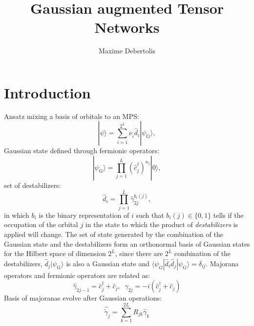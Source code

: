 \documentclass[a4paper, twocolumn, superscriptaddress, longbibliography]{revtex4-2}
\begin{document}
	\author{Maxime Debertolis}
	\title{Gaussian augmented Tensor Networks}

	\begin{abstract}

	\end{abstract}

	\maketitle

	\section{Introduction}
	Ansatz mixing a basis of orbitals to an MPS:
	\begin{equation}
		|\psi \rangle = \sum_{i=1}^{2^{L}} \nu_i^{} \hat{d}_i^{} |\psi_{\mathrm{G}}^{}\rangle,
	\end{equation}
	Gaussian state defined through fermionic operators:
	\begin{equation}
		|\psi_{\mathrm{G}}\rangle = \prod_{j=1}^{L}\left(\hat{c}_{j}^{\dagger}\right)^{n_j}|0\rangle,
	\end{equation}
	set of destabilizers:
	\begin{equation}
		\hat{d}_i = \prod_{j=1}^{L}\hat{\gamma}_{2j}^{b_{i}(j)},
	\end{equation}
	in which $b_i$ is the binary representation of $i$ such that $b_{i}(j) \in \{0,1\}$ tells if the occupation of the orbital $j$ in the state to which the product of \emph{destabilizers} is applied will change. The set of state generated by the combination of the Gaussian state and the destabilizers form an orthonormal basis of Gaussian states for the Hilbert space of dimension $2^{L}$, since there are $2^L$ combination of the destabilizers, $\hat{d}_j |\psi_{\mathrm{G}}\rangle$ is also a Gaussian state and $\langle \psi_{G}|\hat{d}_i \hat{d}_j |\psi_{\mathrm{G}}\rangle = \delta_{ij}$.
	Majorana operators and fermionic operators are related as:
	\begin{equation}
		\hat{\gamma}_{2j-1} = \hat{c}^{\dagger}_{j} + \hat{c}_{j}, \;\;
		\hat{\gamma}_{2j} = -i ( \hat{c}^{\dagger}_{j} + \hat{c}_{j})
	\end{equation}
	Basis of majoranas evolve after Gaussian operations:
	\begin{equation}
		\hat{\tilde{\gamma}}_j = \sum_{k=1}^{2L} R_{jk}\hat{\gamma}_{k}
	\end{equation}
\end{document}
